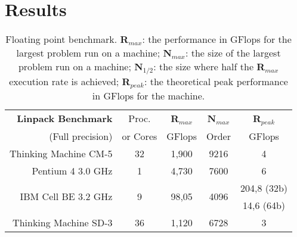 \section{Results}
\blindtext

\begin{table}[!htpb]
    \caption{Floating point benchmark.
	\textbf{R$_{max}$}: the performance in GFlops for the largest problem run on a machine; \textbf{N$_{max}$}: the size of the largest problem run on a machine; \textbf{N$_{1/2}$}: the size where half the \textbf{R$_{max}$} execution rate is achieved; \textbf{R$_{peak}$}: the theoretical peak performance in GFlops for the machine.}
    \label{tab:table-01}
    \centering
    \begin{tabularx}{\linewidth}{rcccc}
        \toprule
        \textbf{Linpack	Benchmark}& Proc. & \textbf{R$_{max}$} & \textbf{N$_{max}$} & \textbf{R$_{peak}$} \\ 
        (Full precision) & or Cores	& GFlops & Order & GFlops \\ [0.25ex] 
        \midrule
        Thinking Machine CM-5 & 32 & 1,900 & 9216 & 4 \\
        Pentium 4 3.0 GHz & 1 & 4,730 & 7600 & 6 \\
        \multirow{2}{*}{IBM Cell BE 3.2 GHz} & \multirow{2}{*}{9} & \multirow{2}{*}{98,05} & \multirow{2}{*}{4096} & 204,8 \scriptsize{(32b)} \\
        & & & & 14,6 \scriptsize{(64b)} \\
        Thinking Machine SD-3 & 36 & 1,120 & 6728 & 3 \\
        \bottomrule
    \end{tabularx}
\end{table}